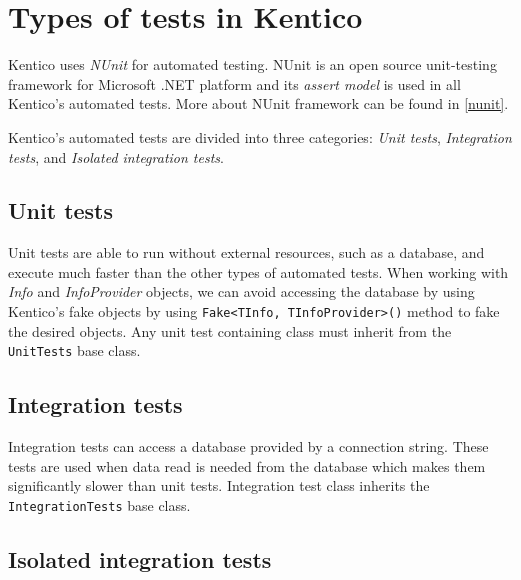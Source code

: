 \documentclass[
  print,
  table,
  nolof,
  nolot,
  nocover,
  oneside
]{fithesis3}
\begin{document}
\section{Types of tests in Kentico}
\label{kentico tests}

Kentico uses \textit{NUnit} for automated testing. NUnit is an open source unit-testing framework for Microsoft .NET platform and its \textit{assert model} is used in all Kentico's automated tests. More about NUnit framework can be found in \autoref{nunit}.

Kentico's automated tests are divided into three categories: \textit{Unit tests}, \textit{Integration tests}, and \textit{Isolated integration tests}\parencite{kentico_tests}.

\subsection{Unit tests}
\label{unit tests}

Unit tests are able to run without external resources, such as a database, and execute much faster than the other types of automated tests. When working with \textit{Info} and \textit{InfoProvider} objects, we can avoid accessing the database by using Kentico's fake objects by using \texttt{Fake<TInfo, TInfoProvider>()} method to fake the desired objects. Any unit test containing class must inherit from the \texttt{UnitTests} base class.

\subsection{Integration tests}
\label{integration test}

Integration tests can access a database provided by a connection string. These tests are used when data read is needed from the database which makes them significantly slower than unit tests. Integration test class inherits the \texttt{IntegrationTests} base class.

\subsection{Isolated integration tests}
\label{isolated integration test}
\end{document}
